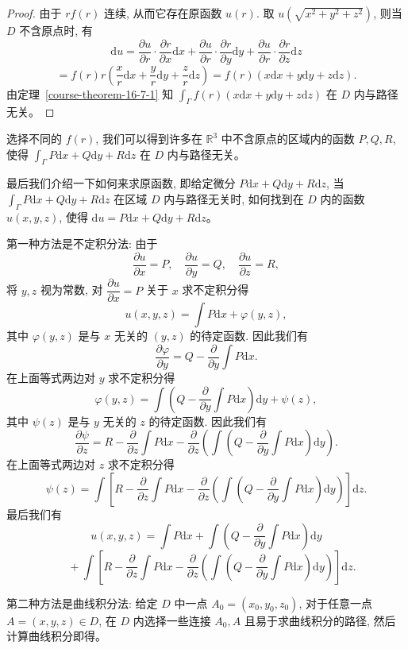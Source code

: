 \documentclass[UTF8,12pt,a4paper,fontset=fandol]{ctexart}
\begin{document}
\begin{proof}\quad 由于 $rf(r)$ 连续, 从而它存在原函数 $u(r)$. 取 $u(\sqrt{x^2+y^2+z^2})$, 则当 $D$ 不含原点时, 有
\[
  \mathrm du
  =\frac{\partial u}{\partial r}\cdot\frac{\partial r}{\partial x}\mathrm dx
  +\frac{\partial u}{\partial r}\cdot\frac{\partial r}{\partial y}\mathrm dy
  +\frac{\partial u}{\partial r}\cdot\frac{\partial r}{\partial z}\mathrm dz
\]
\[
  =f(r)r\left(\frac{x}{r}\mathrm dx+\frac{y}{r}\mathrm dy+\frac{z}{r}\mathrm dz\right)
  =f(r)(x\mathrm dx+y\mathrm dy+z\mathrm dz).
\]
由定理~\ref{course-theorem-16-7-1}  知 $\int_\Gamma f(r)(x\mathrm dx+y\mathrm dy+z\mathrm dz)$ 在 $D$ 内与路径无关。

\end{proof}
\begin{remark}\quad 选择不同的 $f(r)$, 我们可以得到许多在 $\mathbb R^3$ 中不含原点的区域内的函数 $P,Q,R$, 使得 $\int_\Gamma P\mathrm dx+Q\mathrm dy+R\mathrm dz$ 在 $D$ 内与路径无关。

最后我们介绍一下如何来求原函数, 即给定微分 $P\mathrm dx+Q\mathrm dy+R\mathrm dz$, 当 $\int_\Gamma P\mathrm dx+Q\mathrm dy+R\mathrm dz$ 在区域 $D$ 内与路径无关时, 如何找到在 $D$ 内的函数 $u(x,y,z)$, 使得 $\mathrm du=P\mathrm dx+Q\mathrm dy+R\mathrm dz$。

第一种方法是不定积分法: 由于
\[
  \frac{\partial u}{\partial x}=P,\quad
  \frac{\partial u}{\partial y}=Q,\quad
  \frac{\partial u}{\partial z}=R,
\]
将 $y,z$ 视为常数, 对 $\dfrac{\partial u}{\partial x}=P$ 关于 $x$ 求不定积分得
\[
  u(x,y,z)=\int P\mathrm dx+\varphi(y,z),
\]
其中 $\varphi(y,z)$ 是与 $x$ 无关的 $(y,z)$ 的待定函数. 因此我们有
\[
  \frac{\partial\varphi}{\partial y}
  =Q-\frac{\partial}{\partial y}\int P\mathrm dx.
\]
在上面等式两边对 $y$ 求不定积分得
\[
  \varphi(y,z)=\int\left(Q-\frac{\partial}{\partial y}\int P\mathrm dx\right)\mathrm dy+\psi(z),
\]
其中 $\psi(z)$ 是与 $y$ 无关的 $z$ 的待定函数. 因此我们有
\[
  \frac{\partial\psi}{\partial z}
  =
  R-\frac{\partial}{\partial z}\int P\mathrm dx
  -\frac{\partial}{\partial z}
  \left(\int\left(Q-\frac{\partial}{\partial y}\int P\mathrm dx\right)\mathrm dy\right).
\]
在上面等式两边对 $z$ 求不定积分得
\[
  \psi(z)=\int\left[
  R-\frac{\partial}{\partial z}\int P\mathrm dx
  -\frac{\partial}{\partial z}
  \left(\int\left(Q-\frac{\partial}{\partial y}\int P\mathrm dx\right)\mathrm dy\right)
  \right]\mathrm dz.
\]
最后我们有
\[
  u(x,y,z)=\int P\mathrm dx
  +\int\left(Q-\frac{\partial}{\partial y}\int P\mathrm dx\right)\mathrm dy
\]
\[
  \quad+\int\left[
  R-\frac{\partial}{\partial z}\int P\mathrm dx
  -\frac{\partial}{\partial z}
  \left(\int\left(Q-\frac{\partial}{\partial y}\int P\mathrm dx\right)\mathrm dy\right)
  \right]\mathrm dz.
\]

第二种方法是曲线积分法: 给定 $D$ 中一点 $A_0=(x_0,y_0,z_0)$, 对于任意一点 $A=(x,y,z)\in D$, 在 $D$ 内选择一些连接 $A_0,A$ 且易于求曲线积分的路径, 然后计算曲线积分即得。

\end{remark}
\end{document}
